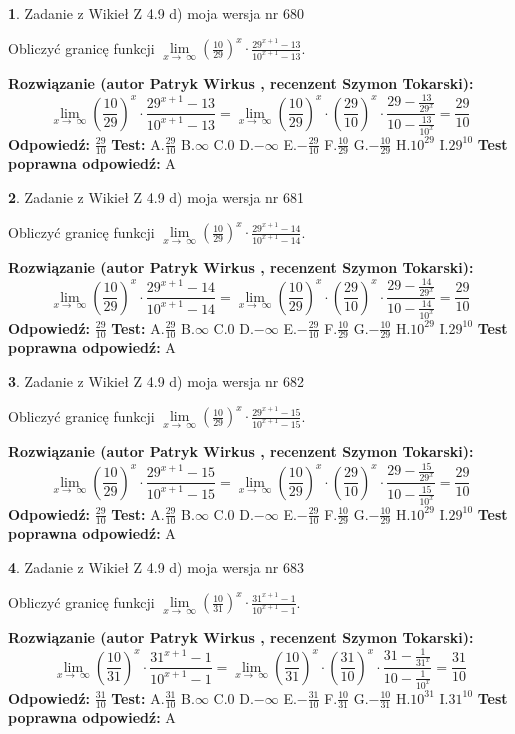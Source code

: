 \documentclass[12pt, a4paper]{article}
\theoremstyle{definition} %
\newtheorem{zad}{}
\newcommand{\zadStart}[1]{\begin{zad}#1\newline}
\newcommand{\zadStop}{\end{zad}}
\newcommand{\rozwStart}[2]{\noindent \textbf{Rozwiązanie (autor #1 , recenzent #2): }\newline}
\newcommand{\rozwStop}{\newline}
\newcommand{\odpStart}{\noindent \textbf{Odpowiedź:}\newline}
\newcommand{\odpStop}{\newline}
\newcommand{\testStart}{\noindent \textbf{Test:}\newline}
\newcommand{\testStop}{\newline}
\newcommand{\kluczStart}{\noindent \textbf{Test poprawna odpowiedź:}\newline}
\newcommand{\kluczStop}{\newline}
\begin{document}
\zadStart{Zadanie z Wikieł Z 4.9 d) moja wersja nr 680}


Obliczyć granicę funkcji  $\lim\limits_{x\to\ \infty}(\frac{10}{29})^{x}\cdot\frac{29^{x+1}-13}{10^{x+1}-13}$.
\zadStop
\rozwStart{Patryk Wirkus}{Szymon Tokarski}
$$\lim\limits_{x\to\ \infty}(\frac{10}{29})^{x}\cdot\frac{29^{x+1}-13}{10^{x+1}-13}=\lim\limits_{x\to\ \infty}(\frac{10}{29})^{x}\cdot(\frac{29}{10})^{x} \cdot \frac{29-\frac{13}{29^{x}}}{10-\frac{13}{10^{x}}} = \frac{29}{10}$$
\rozwStop
\odpStart
$\frac{29}{10}$
\odpStop
\testStart
A.$\frac{29}{10}$ B.$\infty$ C.$0$ D.$-\infty$ E.$-\frac{29}{10}$
F.$\frac{10}{29}$ G.$-\frac{10}{29}$
H.$10^{29}$
I.$29^{10}$
\testStop
\kluczStart
A
\kluczStop



\zadStart{Zadanie z Wikieł Z 4.9 d) moja wersja nr 681}


Obliczyć granicę funkcji  $\lim\limits_{x\to\ \infty}(\frac{10}{29})^{x}\cdot\frac{29^{x+1}-14}{10^{x+1}-14}$.
\zadStop
\rozwStart{Patryk Wirkus}{Szymon Tokarski}
$$\lim\limits_{x\to\ \infty}(\frac{10}{29})^{x}\cdot\frac{29^{x+1}-14}{10^{x+1}-14}=\lim\limits_{x\to\ \infty}(\frac{10}{29})^{x}\cdot(\frac{29}{10})^{x} \cdot \frac{29-\frac{14}{29^{x}}}{10-\frac{14}{10^{x}}} = \frac{29}{10}$$
\rozwStop
\odpStart
$\frac{29}{10}$
\odpStop
\testStart
A.$\frac{29}{10}$ B.$\infty$ C.$0$ D.$-\infty$ E.$-\frac{29}{10}$
F.$\frac{10}{29}$ G.$-\frac{10}{29}$
H.$10^{29}$
I.$29^{10}$
\testStop
\kluczStart
A
\kluczStop



\zadStart{Zadanie z Wikieł Z 4.9 d) moja wersja nr 682}


Obliczyć granicę funkcji  $\lim\limits_{x\to\ \infty}(\frac{10}{29})^{x}\cdot\frac{29^{x+1}-15}{10^{x+1}-15}$.
\zadStop
\rozwStart{Patryk Wirkus}{Szymon Tokarski}
$$\lim\limits_{x\to\ \infty}(\frac{10}{29})^{x}\cdot\frac{29^{x+1}-15}{10^{x+1}-15}=\lim\limits_{x\to\ \infty}(\frac{10}{29})^{x}\cdot(\frac{29}{10})^{x} \cdot \frac{29-\frac{15}{29^{x}}}{10-\frac{15}{10^{x}}} = \frac{29}{10}$$
\rozwStop
\odpStart
$\frac{29}{10}$
\odpStop
\testStart
A.$\frac{29}{10}$ B.$\infty$ C.$0$ D.$-\infty$ E.$-\frac{29}{10}$
F.$\frac{10}{29}$ G.$-\frac{10}{29}$
H.$10^{29}$
I.$29^{10}$
\testStop
\kluczStart
A
\kluczStop



\zadStart{Zadanie z Wikieł Z 4.9 d) moja wersja nr 683}


Obliczyć granicę funkcji  $\lim\limits_{x\to\ \infty}(\frac{10}{31})^{x}\cdot\frac{31^{x+1}-1}{10^{x+1}-1}$.
\zadStop
\rozwStart{Patryk Wirkus}{Szymon Tokarski}
$$\lim\limits_{x\to\ \infty}(\frac{10}{31})^{x}\cdot\frac{31^{x+1}-1}{10^{x+1}-1}=\lim\limits_{x\to\ \infty}(\frac{10}{31})^{x}\cdot(\frac{31}{10})^{x} \cdot \frac{31-\frac{1}{31^{x}}}{10-\frac{1}{10^{x}}} = \frac{31}{10}$$
\rozwStop
\odpStart
$\frac{31}{10}$
\odpStop
\testStart
A.$\frac{31}{10}$ B.$\infty$ C.$0$ D.$-\infty$ E.$-\frac{31}{10}$
F.$\frac{10}{31}$ G.$-\frac{10}{31}$
H.$10^{31}$
I.$31^{10}$
\testStop
\kluczStart
A
\kluczStop
\end{document}
